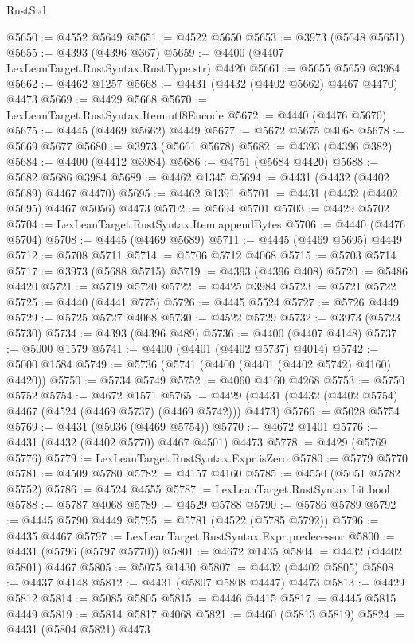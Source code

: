 \begin{lexlean}{RustStd}
\begin{coremodule}
@5650 := @4552 @5649
@5651 := @4522 @5650
@5653 := @3973 (@5648 @5651)
@5655 := @4393 (@4396 @367)
@5659 := @4400 (@4407 LexLeanTarget.RustSyntax.RustType.str) @4420
@5661 := @5655 @5659 @3984
@5662 := @4462 @1257
@5668 := @4431 (@4432 (@4402 @5662) @4467 @4470) @4473
@5669 := @4429 @5668
@5670 := LexLeanTarget.RustSyntax.Item.utf8Encode
@5672 := @4440 (@4476 @5670)
@5675 := @4445 (@4469 @5662) @4449
@5677 := @5672 @5675 @4068
@5678 := @5669 @5677
@5680 := @3973 (@5661 @5678)
@5682 := @4393 (@4396 @382)
@5684 := @4400 (@4412 @3984)
@5686 := @4751 (@5684 @4420)
@5688 := @5682 @5686 @3984
@5689 := @4462 @1345
@5694 := @4431 (@4432 (@4402 @5689) @4467 @4470)
@5695 := @4462 @1391
@5701 := @4431 (@4432 (@4402 @5695) @4467 @5056) @4473
@5702 := @5694 @5701
@5703 := @4429 @5702
@5704 := LexLeanTarget.RustSyntax.Item.appendBytes
@5706 := @4440 (@4476 @5704)
@5708 := @4445 (@4469 @5689)
@5711 := @4445 (@4469 @5695) @4449
@5712 := @5708 @5711
@5714 := @5706 @5712 @4068
@5715 := @5703 @5714
@5717 := @3973 (@5688 @5715)
@5719 := @4393 (@4396 @408)
@5720 := @5486 @4420
@5721 := @5719 @5720
@5722 := @4425 @3984
@5723 := @5721 @5722
@5725 := @4440 (@4441 @775)
@5726 := @4445 @5524
@5727 := @5726 @4449
@5729 := @5725 @5727 @4068
@5730 := @4522 @5729
@5732 := @3973 (@5723 @5730)
@5734 := @4393 (@4396 @489)
@5736 := @4400 (@4407 @4148)
@5737 := @5000 @1579
@5741 := @4400 (@4401 (@4402 @5737) @4014)
@5742 := @5000 @1584
@5749 := @5736 (@5741 (@4400 (@4401 (@4402 @5742) @4160) @4420))
@5750 := @5734 @5749
@5752 := @4060 @4160 @4268
@5753 := @5750 @5752
@5754 := @4672 @1571
@5765 := @4429 (@4431 (@4432 (@4402 @5754) @4467 (@4524 (@4469 @5737) (@4469 @5742))) @4473)
@5766 := @5028 @5754
@5769 := @4431 (@5036 (@4469 @5754))
@5770 := @4672 @1401
@5776 := @4431 (@4432 (@4402 @5770) @4467 @4501) @4473
@5778 := @4429 (@5769 @5776)
@5779 := LexLeanTarget.RustSyntax.Expr.isZero
@5780 := @5779 @5770
@5781 := @4509 @5780
@5782 := @4157 @4160
@5785 := @4550 (@5051 @5782 @5752)
@5786 := @4524 @4555
@5787 := LexLeanTarget.RustSyntax.Lit.bool
@5788 := @5787 @4068
@5789 := @4529 @5788
@5790 := @5786 @5789
@5792 := @4445 @5790 @4449
@5795 := @5781 (@4522 (@5785 @5792))
@5796 := @4435 @4467
@5797 := LexLeanTarget.RustSyntax.Expr.predecessor
@5800 := @4431 (@5796 (@5797 @5770))
@5801 := @4672 @1435
@5804 := @4432 (@4402 @5801) @4467
@5805 := @5075 @1430
@5807 := @4432 (@4402 @5805)
@5808 := @4437 @4148
@5812 := @4431 (@5807 @5808 @4447) @4473
@5813 := @4429 @5812
@5814 := @5085 @5805
@5815 := @4446 @4415
@5817 := @4445 @5815 @4449
@5819 := @5814 @5817 @4068
@5821 := @4460 (@5813 @5819)
@5824 := @4431 (@5804 @5821) @4473

\end{coremodule}
\end{lexlean}
